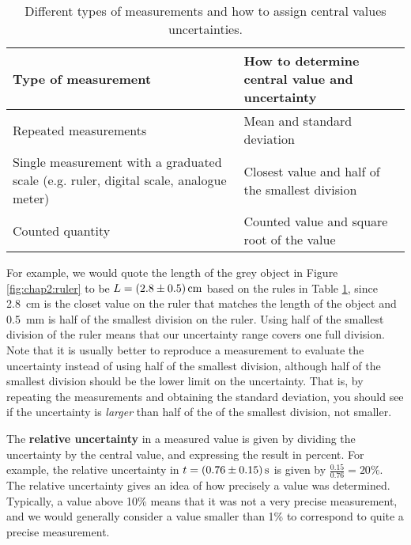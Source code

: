 \begin{table}[!h]
\centering
\begin{tabular}{p{3in}p{3in}} 
\textbf{Type of measurement} &\textbf{How to determine central value and uncertainty} \\
\hline
\hline
Repeated measurements & Mean and standard deviation \\ \hline
Single measurement with a graduated scale (e.g. ruler, digital scale, analogue meter) & Closest value and half of the smallest division\\ \hline
Counted quantity & Counted value and square root of the value \\ \hline
\end{tabular}
\caption{\label{tab:chap2:uncertainties} Different types of measurements and how to assign central values uncertainties.}
\end{table}
For example, we would quote the length of the grey object in Figure \ref{fig:chap2:ruler} to be $L=\SI{2.8\pm0.5}{cm}$ based on the rules in Table \ref{tab:chap2:uncertainties}, since \SI{2.8}{cm} is the closet value on the ruler that matches the length of the object and \SI{0.5}{mm} is half of the smallest division on the ruler. Using half of the smallest division of the ruler means that our uncertainty range covers one full division. Note that it is usually better to reproduce a measurement to evaluate the uncertainty instead of using half of the smallest division, although half of the smallest division should be the lower limit on the uncertainty. That is, by repeating the measurements and obtaining the standard deviation, you should see if the uncertainty is \textit{larger} than half of the of the smallest division, not smaller.


The \textbf{relative uncertainty} in a measured value is given by dividing the uncertainty by the central value, and expressing the result in percent. For example, the relative uncertainty in $t=\SI{0.76\pm 0.15}{s}$ is given by $\frac{0.15}{0.76}=20\%$. The relative uncertainty gives an idea of how precisely a value was determined. Typically, a value above 10\% means that it was not a very precise measurement, and we would generally consider a value smaller than 1\% to correspond to quite a precise measurement. 

